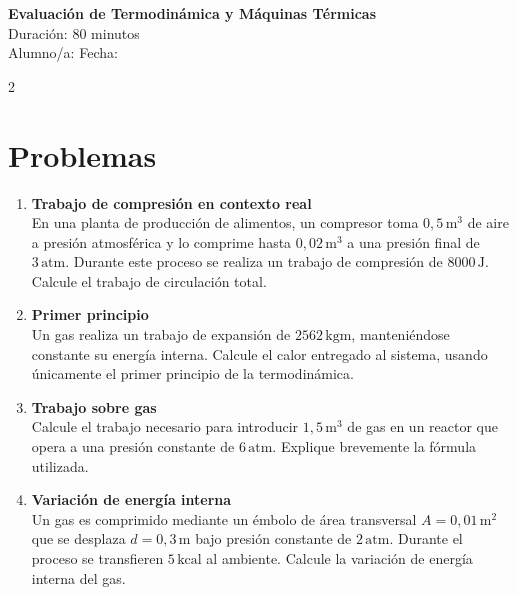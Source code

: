 \documentclass[a4paper,12pt]{article}
\begin{document}
\begin{center}
    \Large \textbf{Evaluación de Termodinámica y Máquinas Térmicas} \\
    \normalsize Duración: 80 minutos \\
    Alumno/a: \underline{\hspace{6cm}} \hspace{0.5cm} Fecha: \underline{\hspace{2cm}}
\end{center}

\vspace{0.3cm}

\begin{multicols}{2}

\section*{Problemas}

\begin{enumerate}

\item \textbf{Trabajo de compresión en contexto real} \\
En una planta de producción de alimentos, un compresor toma $0{,}5\,\text{m}^3$ de aire a presión atmosférica y lo comprime hasta $0{,}02\,\text{m}^3$ a una presión final de $3\,\text{atm}$. Durante este proceso se realiza un trabajo de compresión de $8000\,\text{J}$. Calcule el trabajo de circulación total.

\vspace{0.3cm}

\item \textbf{Primer principio} \\
Un gas realiza un trabajo de expansión de $2562\,\text{kgm}$, manteniéndose constante su energía interna. Calcule el calor entregado al sistema, usando únicamente el primer principio de la termodinámica.

\vspace{0.3cm}

\item \textbf{Trabajo sobre gas } \\
Calcule el trabajo necesario para introducir $1{,}5\,\text{m}^3$ de gas en un reactor que opera a una presión constante de $6\,\text{atm}$. Explique brevemente la fórmula utilizada.

\vspace{0.3cm}

\item \textbf{Variación de energía interna} \\
Un gas es comprimido mediante un émbolo de área transversal $A = 0{,}01\,\text{m}^2$ que se desplaza $d = 0{,}3\,\text{m}$ bajo presión constante de $2\,\text{atm}$. Durante el proceso se transfieren $5\,\text{kcal}$ al ambiente. Calcule la variación de energía interna del gas.


\end{enumerate}
\end{multicols}
\end{document}
